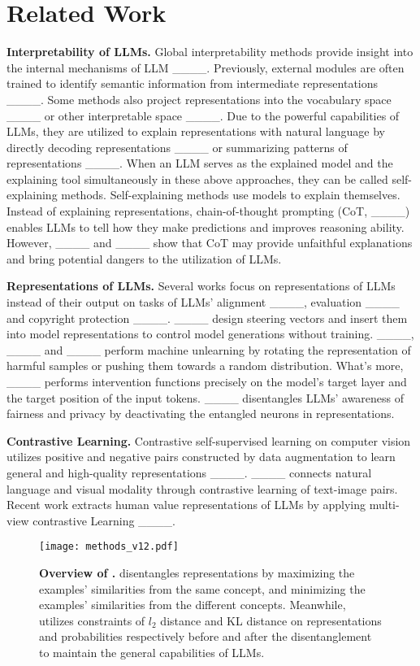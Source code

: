 \section{Related Work}
\textbf{Interpretability of LLMs.} Global interpretability methods provide insight into the internal mechanisms of LLM ____. Previously, external modules are often trained to identify semantic information from intermediate representations ____. Some methods also project representations into the vocabulary space ____ or other interpretable space ____. Due to the powerful capabilities of LLMs, they are utilized to explain representations with natural language by directly decoding representations ____ or summarizing patterns of representations ____. When an LLM serves as the explained model and the explaining tool simultaneously in these above approaches, they can be called self-explaining methods. Self-explaining methods use models to explain themselves. Instead of explaining representations, chain-of-thought prompting (CoT, ____) enables LLMs to tell how they make predictions and improves reasoning ability. However, ____ and ____ show that CoT may provide unfaithful explanations and bring potential dangers to the utilization of LLMs.

\textbf{Representations of LLMs.} Several works focus on representations of LLMs instead of their output on tasks of LLMs' alignment ____, evaluation ____ and copyright protection ____. ____ design steering vectors and insert them into model representations to control model generations without training. ____, ____ and ____ perform machine unlearning by rotating the representation of harmful samples or pushing them towards a random distribution. What's more, ____ performs intervention functions precisely on the model's target layer and the target position of the input tokens. ____ disentangles LLMs’ awareness of fairness and privacy by deactivating the entangled neurons in representations.

\textbf{Contrastive Learning.} Contrastive self-supervised learning on computer vision utilizes positive and negative pairs constructed by data augmentation to learn general and high-quality representations ____. ____ connects natural language and visual modality through contrastive learning of text-image pairs. Recent work extracts human value representations of LLMs by applying multi-view contrastive Learning ____. 


\begin{figure*}[t]
    \vspace{-5pt}
    \centering
    \texttt{[image: methods\_v12.pdf]}
    \vspace{-15pt}
    \caption{\textbf{Overview of \methodFamilyName{}.} \methodFamilyName{} disentangles representations by maximizing the examples' similarities from the same concept, and minimizing the examples' similarities from the different concepts. Meanwhile, \methodFamilyName{} utilizes constraints of $l_2$ distance and KL distance on representations and probabilities respectively before and after the disentanglement to maintain the general capabilities of LLMs. }\label{fig:method}
    \vspace{-10pt}
\end{figure*}